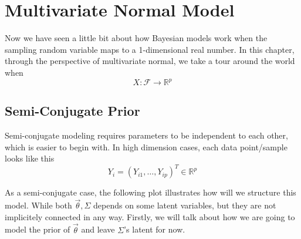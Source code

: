 \chapter{Multivariate Normal Model}

Now we have seen a little bit about how Bayesian models work when the sampling random variable maps to a 1-dimensional real number. In this chapter, through the perspective of multivariate normal, we take a tour around the world when 
\begin{equation*}
    X: \mathcal{F} \rightarrow \mathbb{R}^p
\end{equation*}

\section{Semi-Conjugate Prior}
Semi-conjugate modeling requires parameters to be independent to each other, which is easier to begin with. In high dimension cases, each data point/sample looks like this
\begin{equation*}
    Y_i = (Y_{i1}, \ldots, Y_{ip})^T \in \mathbb{R}^p
\end{equation*}

As a semi-conjugate case, the following plot illustrates how will we structure this model. While both $\vec{\theta}, \Sigma$ depends on some latent variables, but they are not implicitely connected in any way. Firstly, we will talk about how we are going to model the prior of $\vec{\theta}$ and leave $\Sigma$'s latent for now. 

\begin{center}
\end{center}

